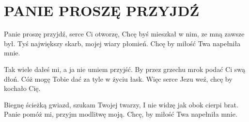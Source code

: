 \documentclass[../../../songbook.tex]{subfiles}
\begin{document}
\TabPositions{8cm} %
\section*{PANIE PROSZĘ PRZYJDŹ}
\vspace{0.5cm}
Panie proszę przyjdź, serce Ci otworzę,		 \newline
Chcę byś mieszkał w nim, ze mną zawsze był.	 \newline
Tyś największy skarb, mojej wiary płomień.	 \newline
Chcę by miłość Twa napełniła mnie.			 \newline

\-\hspace{1cm}Tak wiele dałeś mi, a ja nie umiem przyjść.	 \newline
\-\hspace{1cm}By przez grzechu mrok podać Ci swą dłoń.	 \newline
\-\hspace{1cm}Cóż mogę Tobie dać za tyle w życiu łask.	 \newline
\-\hspace{1cm}Więc serce Jezu weź, chcę by kochało Cię.	 \newline

Biegnę ścieżką gwiazd, szukam Twojej twarzy,	\newline
I nie widzę jak obok cierpi brat.           	\newline   
Panie pomóż mi, przyjm modlitwę moją.           \newline
Chcę, by miłość Twa napełniła mnie.  			\newline
\end{document}
